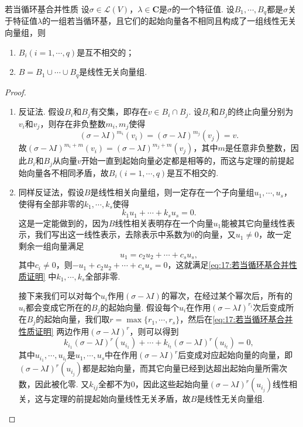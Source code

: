 \begin{lemma}{}{若当循环基合并性质}
    设$\sigma\in\mathcal{L}(V)$，$\lambda\in\mathbf{C}$是$\sigma$的一个特征值. 设$B_1,\cdots,B_q$都是$\sigma$关于特征值$\lambda$的一组若当循环基，且它们的起始向量各不相同且构成了一组线性无关向量组，则
    \begin{enumerate}
        \item $B_i(i=1,\cdots,q)$是互不相交的；
        \item $B=B_1\cup\cdots\cup B_q$是线性无关向量组.
    \end{enumerate}
\end{lemma}
\begin{proof}
    \begin{enumerate}
        \item 反证法. 假设$B_i$和$B_j$有交集，即存在$v\in B_i\cap B_j$. 设$B_i$和$B_j$的终止向量分别为$v_i$和$v_j$，则存在非负整数$m_i,m_j$使得
              \[(\sigma-\lambda I)^{m_i}(v_i)=(\sigma-\lambda I)^{m_j}(v_j)=v.\]
              故$(\sigma-\lambda I)^{m_i+m}(v_i)=(\sigma-\lambda I)^{m_j+m}(v_j)$，其中$m$是任意非负整数，因此$B_i$和$B_j$从向量$v$开始一直到起始向量必定都是相等的，而这与定理的前提起始向量各不相同矛盾，故$B_i(i=1,\cdots,q)$是互不相交的.

        \item 同样反证法，假设$B$是线性相关向量组，则一定存在一个子向量组$u_1,\cdots,u_s$，使得有全部非零的$k_1,\cdots,k_s$使得
              \begin{equation} \label{eq:17:若当循环基合并性质证明}
                  k_1u_1+\cdots+k_su_s=0.
              \end{equation}
              这是一定能做到的，因为$B$线性相关表明存在一个向量$u_1$能被其它向量线性表示，我们写出这一线性表示，去除表示中系数为0的向量，又$u_1\neq 0$，故一定剩余一组向量满足
              \[u_1=c_2u_2+\cdots+c_su_s,\]
              其中$c_i\neq 0$，则$-u_1+c_2u_2+\cdots+c_su_s=0$，这就满足\autoref{eq:17:若当循环基合并性质证明} 中$k_1,\cdots,k_s$全部非零.

              接下来我们可以对每个$u_i$作用$(\sigma-\lambda I)$的幂次，在经过某个幂次后，所有的$u_i$都会变成它所在的$B_j$的起始向量. 假设每个$u_i$在作用$(\sigma-\lambda I)^{r_i}$次后变成所在$B_j$的起始向量，我们取$r=\max\{r_1,\cdots,r_s\}$，然后在\autoref{eq:17:若当循环基合并性质证明} 两边作用$(\sigma-\lambda I)^r$，则可以得到
              \begin{equation}
                  k_{i_1}(\sigma-\lambda I)^r(u_{i_1})+\cdots+k_{i_t}(\sigma-\lambda I)^r(u_{i_t})=0,
              \end{equation}
              其中$u_{i_1},\cdots,u_{i_t}$是$u_1,\cdots,u_s$中在作用$(\sigma-\lambda I)^r$后变成对应起始向量的向量，即$(\sigma-\lambda I)^r(u_{i_j})$都是起始向量，而其它向量已经到达超出起始向量所需次数，因此被化零. 又$k_{ij}$全都不为0，因此这些起始向量$(\sigma-\lambda I)^r(u_{i_j})$线性相关，这与定理的前提起始向量线性无关矛盾，故$B$是线性无关向量组.
    \end{enumerate}
\end{proof}

